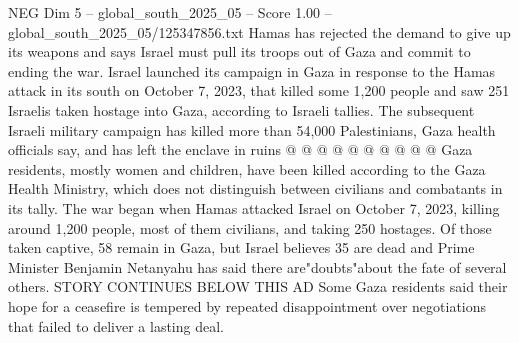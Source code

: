 \begin{textsample}{NEG Dim 5 – global\_south\_2025\_05 – Score 1.00 – global\_south\_2025\_05/125347856.txt}
Hamas has rejected the demand to give up its weapons and says Israel must pull its troops out of Gaza and commit to ending the war.
Israel launched its campaign in Gaza in response to the Hamas attack in its south on October 7, 2023, that killed some 1,200 people and saw 251 Israelis taken hostage into Gaza, according to Israeli tallies.
The subsequent Israeli military campaign has killed more than 54,000 Palestinians, Gaza health officials say, and has left the enclave in ruins @ @ @ @ @ @ @ @ @ @ Gaza residents, mostly women and children, have been killed according to the Gaza Health Ministry, which does not distinguish between civilians and combatants in its tally.
The war began when Hamas attacked Israel on October 7, 2023, killing around 1,200 people, most of them civilians, and taking 250 hostages.
Of those taken captive, 58 remain in Gaza, but Israel believes 35 are dead and Prime Minister Benjamin Netanyahu has said there are"doubts"about the fate of several others.
STORY CONTINUES BELOW THIS AD Some Gaza residents said their hope for a ceasefire is tempered by repeated disappointment over negotiations that failed to deliver a lasting deal.

\end{textsample}
